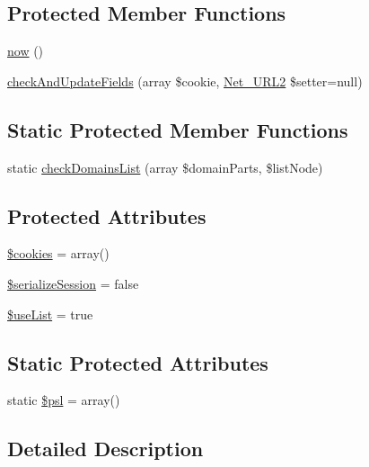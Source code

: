 \subsection*{Protected Member Functions}
\begin{DoxyCompactItemize}
\item 
\hyperlink{classHTTP__Request2__CookieJar_af7f3ec95c4a5b2594004b455c82081d6}{now} ()
\item 
\hyperlink{classHTTP__Request2__CookieJar_a518f04b3620e71b98390e2915e6e6d20}{check\-And\-Update\-Fields} (array \$cookie, \hyperlink{classNet__URL2}{Net\-\_\-\-U\-R\-L2} \$setter=null)
\end{DoxyCompactItemize}
\subsection*{Static Protected Member Functions}
\begin{DoxyCompactItemize}
\item 
static \hyperlink{classHTTP__Request2__CookieJar_a7a04c4cd3170cbf23b42e2cdc1409e7a}{check\-Domains\-List} (array \$domain\-Parts, \$list\-Node)
\end{DoxyCompactItemize}
\subsection*{Protected Attributes}
\begin{DoxyCompactItemize}
\item 
\hyperlink{classHTTP__Request2__CookieJar_ab7bfdc0aa06d9b09b8050cfbdb1afacf}{\$cookies} = array()
\item 
\hyperlink{classHTTP__Request2__CookieJar_ae5e881693fdcfe8cdc23966be0d8a218}{\$serialize\-Session} = false
\item 
\hyperlink{classHTTP__Request2__CookieJar_a931db790fefc72638f7220fc45f16a55}{\$use\-List} = true
\end{DoxyCompactItemize}
\subsection*{Static Protected Attributes}
\begin{DoxyCompactItemize}
\item 
static \hyperlink{classHTTP__Request2__CookieJar_a3ff030e15c5780c2812814e8e7d3131d}{\$psl} = array()
\end{DoxyCompactItemize}


\subsection{Detailed Description}


